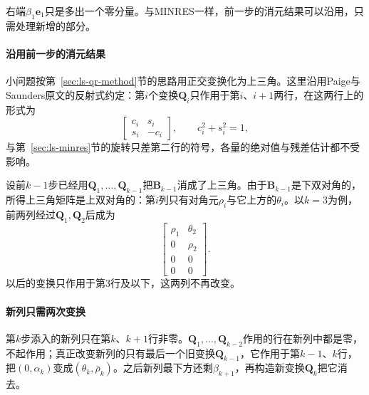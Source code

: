 右端$\beta_1\bm e_1$只是多出一个零分量。与MINRES一样，前一步的消元结果可以沿用，只需处理新增的部分。

\paragraph{沿用前一步的消元结果}
小问题按第~\ref{sec:ls-qr-method}节的思路用正交变换化为上三角。这里沿用Paige与Saunders原文的反射式约定：第$i$个变换$\bm Q_i$只作用于第$i$、$i+1$两行，在这两行上的形式为
\[
 \begin{bmatrix}c_i&s_i\\s_i&-c_i\end{bmatrix},\qquad c_i^2+s_i^2=1 ,
\]
与第~\ref{sec:ls-minres}节的旋转只差第二行的符号，各量的绝对值与残差估计都不受影响。

设前$k-1$步已经用$\bm Q_1,\ldots,\bm Q_{k-1}$把$\bm B_{k-1}$消成了上三角。由于$\bm B_{k-1}$是下双对角的，所得上三角矩阵是上双对角的：第$i$列只有对角元$\rho_i$与它上方的$\theta_i$。以$k=3$为例，前两列经过$\bm Q_1,\bm Q_2$后成为
\[
 \begin{bmatrix}
 \rho_1&\theta_2\\
 0&\rho_2\\
 0&0\\
 0&0
 \end{bmatrix}.
\]
以后的变换只作用于第$3$行及以下，这两列不再改变。

\paragraph{新列只需两次变换}
第$k$步添入的新列只在第$k$、$k+1$行非零。$\bm Q_1,\ldots,\bm Q_{k-2}$作用的行在新列中都是零，不起作用；真正改变新列的只有最后一个旧变换$\bm Q_{k-1}$，它作用于第$k-1$、$k$行，把$(0,\alpha_k)$变成$(\theta_k,\bar\rho_k)$。之后新列最下方还剩$\beta_{k+1}$，再构造新变换$\bm Q_k$把它消去。

